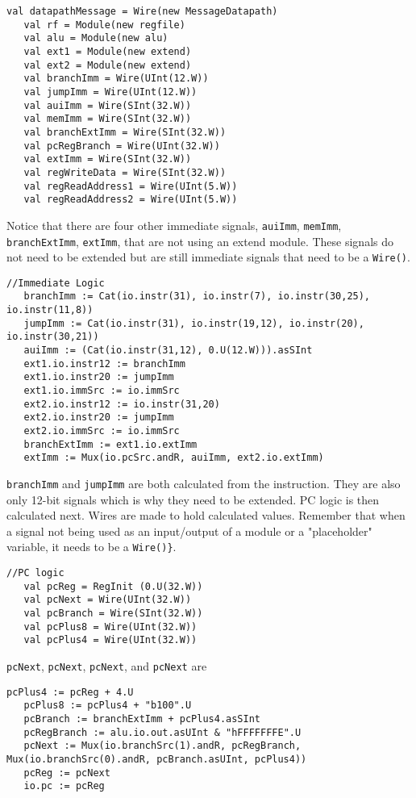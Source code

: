 \documentclass[12pt, letterpaper]{report}
\begin{document}
\begin{lstlisting}[style=scala]
   val datapathMessage = Wire(new MessageDatapath)
   val rf = Module(new regfile)
   val alu = Module(new alu)
   val ext1 = Module(new extend)
   val ext2 = Module(new extend)
   val branchImm = Wire(UInt(12.W))
   val jumpImm = Wire(UInt(12.W))
   val auiImm = Wire(SInt(32.W))
   val memImm = Wire(SInt(32.W))
   val branchExtImm = Wire(SInt(32.W))
   val pcRegBranch = Wire(UInt(32.W))
   val extImm = Wire(SInt(32.W))
   val regWriteData = Wire(SInt(32.W))
   val regReadAddress1 = Wire(UInt(5.W))
   val regReadAddress2 = Wire(UInt(5.W))
\end{lstlisting}

\noindent Notice that there are four other immediate signals, \verb|auiImm|, \verb|memImm|, \verb|branchExtImm|, \verb|extImm|, that are not using an extend module. These signals do not need to be extended but are still immediate signals that need to be a \verb|Wire()|. 

\begin{lstlisting}[style=scala]
   //Immediate Logic
   branchImm := Cat(io.instr(31), io.instr(7), io.instr(30,25), io.instr(11,8))
   jumpImm := Cat(io.instr(31), io.instr(19,12), io.instr(20), io.instr(30,21))
   auiImm := (Cat(io.instr(31,12), 0.U(12.W))).asSInt
   ext1.io.instr12 := branchImm
   ext1.io.instr20 := jumpImm
   ext1.io.immSrc := io.immSrc
   ext2.io.instr12 := io.instr(31,20) 
   ext2.io.instr20 := jumpImm
   ext2.io.immSrc := io.immSrc
   branchExtImm := ext1.io.extImm
   extImm := Mux(io.pcSrc.andR, auiImm, ext2.io.extImm)
\end{lstlisting}

\noindent \verb|branchImm| and \verb|jumpImm| are both calculated from the instruction. They are also only 12-bit signals which is why they need to be extended.
PC logic is then calculated next. Wires are made to hold calculated values. Remember that when a signal not being used as an input/output of a module or a "placeholder" variable, it needs to be a \verb|Wire()}|.
 
\begin{lstlisting}[style=scala]
   //PC logic
   val pcReg = RegInit (0.U(32.W))
   val pcNext = Wire(UInt(32.W))
   val pcBranch = Wire(SInt(32.W))
   val pcPlus8 = Wire(UInt(32.W))
   val pcPlus4 = Wire(UInt(32.W))  
\end{lstlisting}

\verb|pcNext|, \verb|pcNext|, \verb|pcNext|, and \verb|pcNext| are
\begin{lstlisting}[style=scala]
   pcPlus4 := pcReg + 4.U
   pcPlus8 := pcPlus4 + "b100".U
   pcBranch := branchExtImm + pcPlus4.asSInt
   pcRegBranch := alu.io.out.asUInt & "hFFFFFFFE".U
   pcNext := Mux(io.branchSrc(1).andR, pcRegBranch, Mux(io.branchSrc(0).andR, pcBranch.asUInt, pcPlus4))
   pcReg := pcNext
   io.pc := pcReg
\end{lstlisting}
\end{document}
